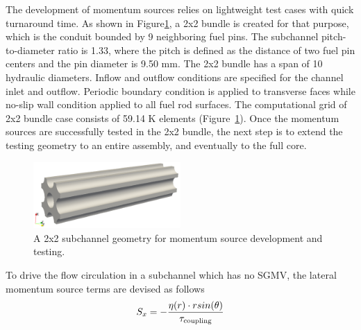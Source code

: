The development of momentum sources relies on lightweight test cases with quick turnaround time. As shown in Figure\ref{fig:model2x2}, a 2x2 bundle is created for that purpose, which is the conduit bounded by 9 neighboring fuel pins. The subchannel pitch-to-diameter ratio is 1.33, where the pitch is defined as the distance of two fuel pin centers and the pin diameter is 9.50 mm. The 2x2 bundle has a span of 10 hydraulic diameters. Inflow and outflow conditions are specified for the channel inlet and outflow. Periodic boundary condition is applied to transverse faces while no-slip wall condition applied to all fuel rod surfaces. The computational grid of 2x2 bundle case consists of 59.14 K elements (Figure~\ref{fig:model2x2}). Once the momentum sources are successfully tested in the 2x2 bundle, the next step is to extend the testing geometry to an entire assembly, and eventually to the full core.

\begin{figure}[!ht]
\centering
\includegraphics[width=0.5\textwidth]{./figures/3DModel_of_bundle2x2.png}
\caption{A 2x2 subchannel geometry for momentum source development and testing. }
\label{fig:model2x2}
\end{figure}

To drive the flow circulation in a subchannel which has no SGMV, the lateral momentum source terms are devised as follows
\begin{equation}
  S_x = -\frac{\eta(r)\cdot r sin(\theta)}{\tau_\text{coupling}}\\
\end{equation}

